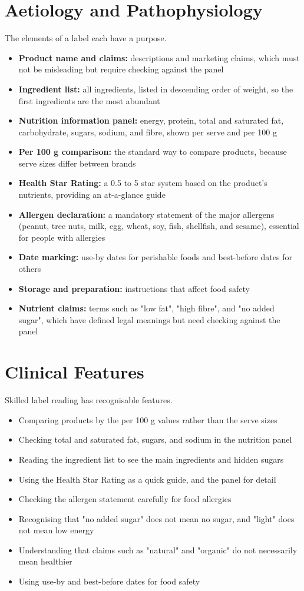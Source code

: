 \section*{Aetiology and Pathophysiology}
The elements of a label each have a purpose.
\begin{itemize}
    \item \textbf{Product name and claims:} descriptions and marketing claims, which must not be misleading but require checking against the panel
    \item \textbf{Ingredient list:} all ingredients, listed in descending order of weight, so the first ingredients are the most abundant
    \item \textbf{Nutrition information panel:} energy, protein, total and saturated fat, carbohydrate, sugars, sodium, and fibre, shown per serve and per 100 g
    \item \textbf{Per 100 g comparison:} the standard way to compare products, because serve sizes differ between brands
    \item \textbf{Health Star Rating:} a 0.5 to 5 star system based on the product's nutrients, providing an at-a-glance guide
    \item \textbf{Allergen declaration:} a mandatory statement of the major allergens (peanut, tree nuts, milk, egg, wheat, soy, fish, shellfish, and sesame), essential for people with allergies
    \item \textbf{Date marking:} use-by dates for perishable foods and best-before dates for others
    \item \textbf{Storage and preparation:} instructions that affect food safety
    \item \textbf{Nutrient claims:} terms such as "low fat", "high fibre", and "no added sugar", which have defined legal meanings but need checking against the panel
\end{itemize}

\section*{Clinical Features}
Skilled label reading has recognisable features.
\begin{itemize}
    \item Comparing products by the per 100 g values rather than the serve sizes
    \item Checking total and saturated fat, sugars, and sodium in the nutrition panel
    \item Reading the ingredient list to see the main ingredients and hidden sugars
    \item Using the Health Star Rating as a quick guide, and the panel for detail
    \item Checking the allergen statement carefully for food allergies
    \item Recognising that "no added sugar" does not mean no sugar, and "light" does not mean low energy
    \item Understanding that claims such as "natural" and "organic" do not necessarily mean healthier
    \item Using use-by and best-before dates for food safety
\end{itemize}

